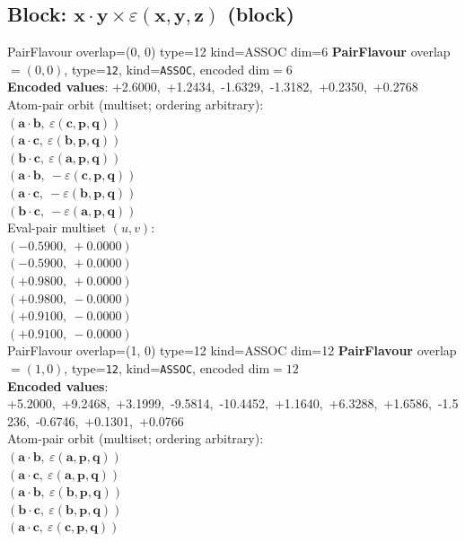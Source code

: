 \documentclass[a4paper,11pt]{article}
\newcommand{\pdcegfomjfhook}[2]{\mathbf{#1} \cdot \mathbf{#2}}
\newcommand{\kblbmcpggoncpf}[3]{\varepsilon(\mathbf{#1},\mathbf{#2},\mathbf{#3})}
\begin{document}
\subsection{Block: $\pdcegfomjfhook{x}{y} \times \kblbmcpggoncpf{x}{y}{z}$  (block)}
    PairFlavour  overlap=(0, 0)  type=12  kind=ASSOC  dim=6
\textbf{PairFlavour} overlap$=(0, 0)$, type=\texttt{12}, kind=\texttt{ASSOC}, encoded dim$=6$\\
\textbf{      Encoded values}: +2.6000,\ +1.2434,\ -1.6329,\ -1.3182,\ +0.2350,\ +0.2768\\
\quad Atom-pair orbit (multiset; ordering arbitrary):\\
$(\pdcegfomjfhook{a}{b},\ \kblbmcpggoncpf{c}{p}{q})$\\
$(\pdcegfomjfhook{a}{c},\ \kblbmcpggoncpf{b}{p}{q})$\\
$(\pdcegfomjfhook{b}{c},\ \kblbmcpggoncpf{a}{p}{q})$\\
$(\pdcegfomjfhook{a}{b},\ -\kblbmcpggoncpf{c}{p}{q})$\\
$(\pdcegfomjfhook{a}{c},\ -\kblbmcpggoncpf{b}{p}{q})$\\
$(\pdcegfomjfhook{b}{c},\ -\kblbmcpggoncpf{a}{p}{q})$\\
\quad Eval-pair multiset $(u, v)$:\\
$(-0.5900,\ +0.0000)$\\
$(-0.5900,\ +0.0000)$\\
$(+0.9800,\ +0.0000)$\\
$(+0.9800,\ -0.0000)$\\
$(+0.9100,\ -0.0000)$\\
$(+0.9100,\ -0.0000)$\\
    PairFlavour  overlap=(1, 0)  type=12  kind=ASSOC  dim=12
\textbf{PairFlavour} overlap$=(1, 0)$, type=\texttt{12}, kind=\texttt{ASSOC}, encoded dim$=12$\\
\textbf{      Encoded values}: +5.2000,\ +9.2468,\ +3.1999,\ -9.5814,\ -10.4452,\ +1.1640,\ +6.3288,\ +1.6586,\ -1.5236,\ -0.6746,\ +0.1301,\ +0.0766\\
\quad Atom-pair orbit (multiset; ordering arbitrary):\\
$(\pdcegfomjfhook{a}{b},\ \kblbmcpggoncpf{a}{p}{q})$\\
$(\pdcegfomjfhook{a}{c},\ \kblbmcpggoncpf{a}{p}{q})$\\
$(\pdcegfomjfhook{a}{b},\ \kblbmcpggoncpf{b}{p}{q})$\\
$(\pdcegfomjfhook{b}{c},\ \kblbmcpggoncpf{b}{p}{q})$\\
$(\pdcegfomjfhook{a}{c},\ \kblbmcpggoncpf{c}{p}{q})$\\
\end{document}
